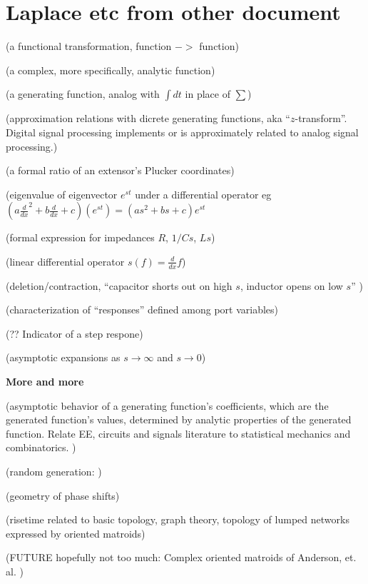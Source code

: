 \documentclass{article}
\begin{document}
 



\section{Laplace etc from other document}


(a functional transformation, function $->$ function)

(a complex, more specifically, analytic function)

(a generating function, analog with $\int dt$ in place of $\sum$)

(approximation relations with dicrete generating functions, 
aka ``$z$-transform''. Digital signal processing implements or
is approximately related to analog signal processing.)

(a formal ratio of an extensor's Plucker coordinates)

(eigenvalue of eigenvector $e^{s t}$ under a differential operator eg 
$(a\frac{d}{dx}^2 + b\frac{d}{dx} + c)(e^{st}) = (as^2 +bs + c)e^{st}$

(formal expression for impedances $R$, $1/Cs$, $Ls$)

(linear differential operator $s(f) = \frac{d}{dx}f$)

(deletion/contraction, 
``capacitor shorts out on high $s$, inductor opens on low $s$'' 
\cite{intuitAna})

(characterization of ``responses'' defined among port variables)

(?? Indicator of a step respone)

(asymptotic expansions as $s\rightarrow\infty$
and $s\rightarrow 0$)

\noindent\textbf{More and more}

(asymptotic behavior of a generating function's coefficients, which are
the generated function's values, determined by analytic properties of the
generated function.  Relate EE, circuits and signals literature to 
statistical mechanics and combinatorics.  
\cite{statMechForGraphers,multivarHalfPlane,AnalyticCombinatoricsBook})

(random generation: \cite{BoltzmanSampRandCombGen})

(geometry of phase shifts)

(risetime related to basic topology, graph theory, topology of lumped
networks expressed by oriented matroids)

(FUTURE hopefully not too much: Complex oriented matroids of Anderson, et.
al. \cite{complexOM})




{}

\end{document}
